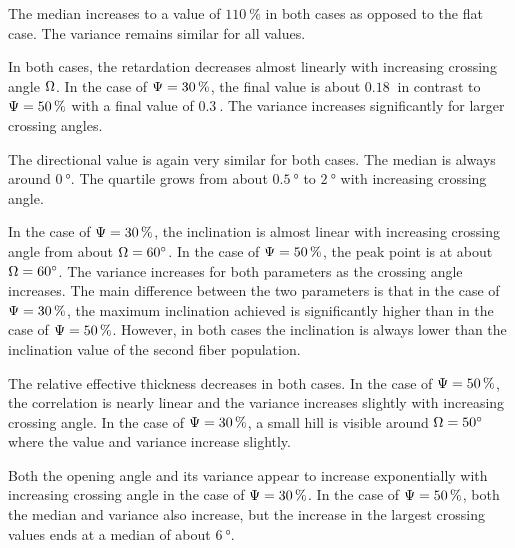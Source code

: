 The median increases to a value of $\SI{110}{\percent}$ in both cases as opposed to the flat case.
The variance remains similar for all values.
\par
In both cases, the retardation decreases almost linearly with increasing crossing angle $\textnormal{$\Omega$}$.
In the case of $\textnormal{$\Psi$} = \SI{30}{\percent}$, the final value is about $\SI{0.18}{}$ in contrast to $\textnormal{$\Psi$} = \SI{50}{\percent}$ with a final value of $\SI{0.3}{}$.
The variance increases significantly for larger crossing angles.
\par
The directional value is again very similar for both cases.
The median is always around $\SI{0}{\degree}$.
The quartile grows from about $\SI{0.5}{\degree}$ to $\SI{2}{\degree}$ with increasing crossing angle.
\par
In the case of $\textnormal{$\Psi$} = \SI{30}{\percent}$, the inclination is almost linear with increasing crossing angle from about $\textnormal{$\Omega$} =\SI{60}{\degree}$.
In the case of $\textnormal{$\Psi$} = \SI{50}{\percent}$, the peak point is at about $\textnormal{$\Omega$} = \SI{60}{\degree}$.
The variance increases for both parameters as the crossing angle increases.
The main difference between the two parameters is that in the case of $\textnormal{$\Psi$} = \SI{30}{\percent}$, the maximum inclination achieved is significantly higher than in the case of $\textnormal{$\Psi$} = \SI{50}{\percent}$.
However, in both cases the inclination is always lower than the inclination value of the second fiber population.
\par
The relative effective thickness \trel{} decreases in both cases.
In the case of $\textnormal{$\Psi$} = \SI{50}{\percent}$, the correlation is nearly linear and the variance increases slightly with increasing crossing angle.
In the case of $\textnormal{$\Psi$} = \SI{30}{\percent}$, a small hill is visible around $\textnormal{$\Omega$} = \SI{50}{\degree}$ where the value and variance increase slightly.
\par
Both the opening angle and its variance appear to increase exponentially with increasing crossing angle in the case of $\textnormal{$\Psi$} = \SI{30}{\percent}$.
In the case of $\textnormal{$\Psi$} = \SI{50}{\percent}$, both the median and variance also increase, but the increase in the largest crossing values ends at a median of about $\SI{6}{\degree}$.
%
